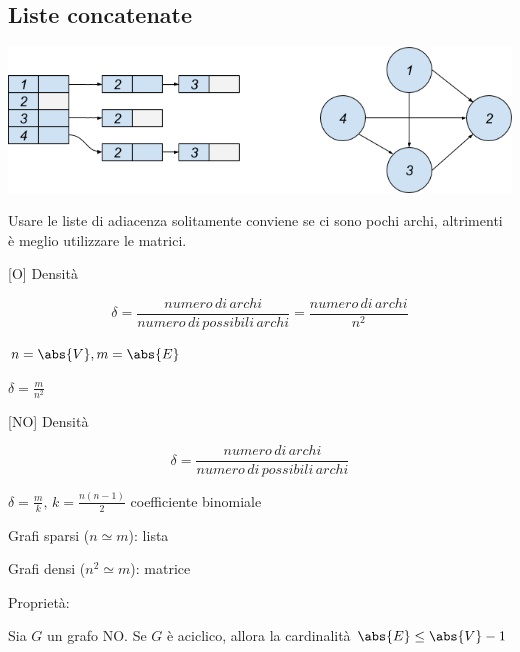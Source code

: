 \documentclass{article}
\begin{document}
\subsection{\texorpdfstring{{}}{}}\label{h.fq77zq901ude}

\hypertarget{h.qwq1tiruc9xg}{\subsection{\texorpdfstring{{Liste
concatenate}}{Liste concatenate}}\label{h.qwq1tiruc9xg}}

{}

{\includegraphics{images/image537.png}}

{}

{}

{Usare le liste di adiacenza solitamente conviene se ci sono pochi
archi, altrimenti è meglio utilizzare le matrici.}

{}

{{[}O{]} Densità}

\begin{equation}
\delta=\frac{numero\,di\,archi}{numero\,di\,possibili\,archi} = \frac{numero\,di\,archi}{n^2}
\end{equation}

$n=\abs{V},m=\abs{E}$

$\delta=\frac{m}{n^2}$

{{[}NO{]} Densità}

\begin{equation}
\delta=\frac{numero\,di\,archi}{numero\,di\,possibili\,archi}
\end{equation}

{$\delta=\frac{m}{k},\,k = \frac{n(n-1)}{2}$ coefficiente binomiale}

{}

{Grafi sparsi ($n\simeq m$): lista}

{Grafi densi ($n^2\simeq m$): matrice}

{}

{Proprietà:}

{Sia $G$ un grafo NO. Se $G$ è aciclico, allora la cardinalità $\abs{E} \leq \abs{V}-1$}
\end{document}
